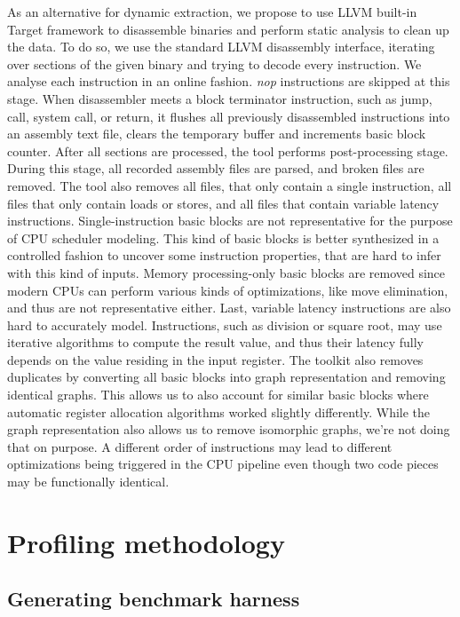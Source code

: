 As an alternative for dynamic extraction, we propose to use LLVM built-in Target framework to 
disassemble binaries and perform static analysis to clean up the data. To do so, we use the standard 
LLVM disassembly interface, iterating over sections of the given binary and trying to decode every 
instruction. We analyse each instruction in an online fashion. \textit{nop} instructions are skipped 
at this stage. When disassembler meets a block terminator instruction, such as jump, call, system 
call, or return, it flushes all previously disassembled instructions into an assembly text file, 
clears the temporary buffer and increments basic block counter. After all sections are processed, 
the tool performs post-processing stage. During this stage, all recorded assembly files are parsed, 
and broken files are removed. The tool also removes all files, that only contain a single instruction, 
all files that only contain loads or stores, and all files that contain variable latency instructions. 
Single-instruction basic blocks are not representative for the purpose of CPU scheduler modeling. 
This kind of basic blocks is better synthesized in a controlled fashion to uncover some instruction 
properties, that are hard to infer with this kind of inputs. Memory processing-only basic blocks are 
removed since modern CPUs can perform various kinds of optimizations, like move 
elimination\cite{Intel64IA322022}, and thus are not representative either. Last, variable latency 
instructions are also hard to accurately model. Instructions, such as division or square root, may 
use iterative algorithms to compute the result value, and thus their latency fully depends on the 
value residing in the input register. The toolkit also removes duplicates by converting all basic 
blocks into graph representation and removing identical graphs. This allows us to also account for 
similar basic blocks where automatic register allocation algorithms worked slightly differently. 
While the graph representation also allows us to remove isomorphic graphs, we're not doing that on purpose. 
A different order of instructions may lead to different optimizations being triggered in the CPU pipeline 
even though two code pieces may be functionally identical.

\section{Profiling methodology}

\subsection{Generating benchmark harness}

